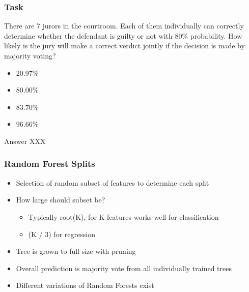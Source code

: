 \begin{frame}[fragile]\frametitle{Task}
There are 7 jurors in the courtroom. Each of them individually can correctly determine whether the defendant is guilty or not with 80\% probability. How likely is the jury will make a correct verdict jointly if the decision is made by majority voting?

\begin{itemize}
\item 20.97\%
\item 80.00\%
\item 83.70\%
\item 96.66\%
\end{itemize}
Answer XXX
\end{frame}

\begin{frame}[fragile]\frametitle{Random Forest Splits}
\begin{itemize}
\item Selection of random subset of features to determine each split
\item How large should subset be?
\begin{itemize}
\item Typically root(K), for K features works well for classification
\item (K / 3) for regression
\end{itemize}
\item Tree is grown to full size with pruning
\item Overall prediction is majority vote from all individually trained trees
\item Different variations of Random Forests exist
\end{itemize}
\end{frame}






